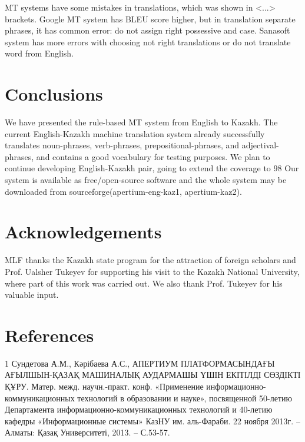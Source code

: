 \documentclass[11pt]{article}
\begin{document}
MT systems have some mistakes in translations, which was shown in <...> brackets. Google MT system has BLEU score higher, but in translation separate phrases, it has common error: do not assign right possessive and case. Sanasoft system has more errors with choosing not right translations or do not translate word from English. 

\section{Conclusions}

We have presented the rule-based MT system from English to Kazakh. The current English-Kazakh machine translation system already successfully translates noun-phrases, verb-phrases, prepositional-phrases, and adjectival-phrases, and contains a good vocabulary for testing purposes. 
We plan to continue developing English-Kazakh pair, going to extend the coverage to 98%
Our system is available as free/open-source software and the whole system may be downloaded from sourceforge(apertium-eng-kaz1, apertium-kaz2).

\section*{Acknowledgements}

MLF thanks the Kazakh state program for the attraction of foreign scholars and Prof. Ualsher Tukeyev for supporting his visit to the Kazakh National University, where part of this work was carried out. We also thank Prof. Tukeyev for his valuable input.

\section{References}
1 Сундетова А.М., Кәрібаева А.С., АПЕРТИУМ ПЛАТФОРМАСЫНДАҒЫ АҒЫЛШЫН-ҚАЗАҚ МАШИНАЛЫҚ АУДАРМАШЫ ҮШІН ЕКІТІЛДІ СӨЗДІКТІ ҚҰРУ. Матер. межд. научн.-практ. конф. «Применение информационно-коммуникационных технологий в образовании и науке», посвященной 50-летию Департамента информационно-коммуникационных технологий и 40-летию кафедры «Информационные системы» КазНУ им. аль-Фараби. 22 ноября 2013г. – Алматы: Қазақ Университеті, 2013. – С.53-57.
\end{document}
